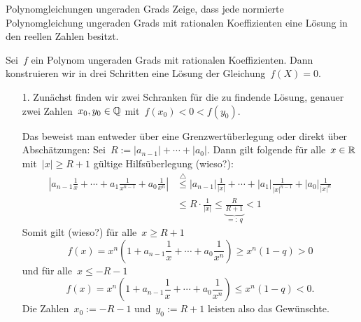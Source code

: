 \documentclass{algblatt}
\begin{document}
\begin{aufgabe}{Polynomgleichungen ungeraden Grads}
Zeige, dass jede normierte Polynomgleichung ungeraden Grads mit rationalen
Koeffizienten eine Lösung in den reellen Zahlen besitzt.
\begin{loesung}Sei~$f$ ein Polynom ungeraden Grads mit rationalen
Koeffizienten. Dann konstruieren wir in drei Schritten eine Lösung der
Gleichung~$f(X) = 0$.
\begin{enumerate}
\item[1.] Zunächst finden wir zwei Schranken für die zu findende Lösung, genauer
zwei Zahlen~$x_0, y_0 \in \mathbb{Q}$ mit~$f(x_0) < 0 < f(y_0)$.

Das beweist man entweder über eine Grenzwertüberlegung oder direkt über
Abschätzungen: Sei~$R := |a_{n-1}| + \cdots + |a_0|$. Dann gilt folgende für
alle~$x \in \mathbb{R}$ mit~$|x| \geq R + 1$ gültige Hilfsüberlegung (wieso?):
\begin{align*}
  \left|a_{n-1} \frac{1}{x} + \cdots + a_1 \frac{1}{x^{n-1}} + a_0
  \frac{1}{x^n}\right| &\stackrel{\triangle}{\leq}
  |a_{n-1}| \frac{1}{|x|} + \cdots + |a_1| \frac{1}{|x|^{n-1}} + |a_0|
  \frac{1}{|x|^n} \\
  &\leq R \cdot \frac{1}{|x|}
  \leq \underbrace{\frac{R}{R+1}}_{=:\,q} < 1
\end{align*}
Somit gilt (wieso?) für alle~$x \geq R + 1$
\[ f(x) = x^n \left(1 + a_{n-1} \frac{1}{x} + \cdots + a_0 \frac{1}{x^n}\right)
  \geq x^n \left(1 - q\right) > 0 \]
und für alle~$x \leq -R - 1$
\[ f(x) = x^n \left(1 + a_{n-1} \frac{1}{x} + \cdots + a_0 \frac{1}{x^n}\right)
  \leq x^n \left(1 - q\right) < 0. \]
Die Zahlen~$x_0 := -R - 1$ und~$y_0 := R + 1$ leisten also das Gewünschte.


\end{enumerate}
\end{loesung}
\end{aufgabe}
\end{document}
